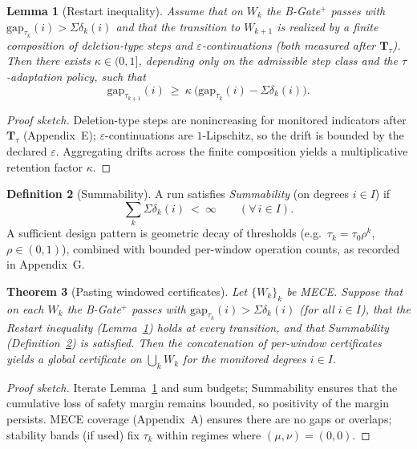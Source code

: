\documentclass[11pt]{article}
\numberwithin{equation}{section}
\newtheorem{theorem}{Theorem}[section]
\newtheorem{lemma}[theorem]{Lemma}
\theoremstyle{definition}
\newtheorem{definition}[theorem]{Definition}
\begin{document}
\begin{lemma}[Restart inequality]\label{J:lem:restart}
Assume that on \(W_k\) the B-Gate\(^{+}\) passes with \(\mathrm{gap}_{\tau_k}(i)>\Sigma\delta_k(i)\) and that the transition to \(W_{k+1}\) is realized by a finite composition of \emph{deletion-type} steps and \(\varepsilon\)-continuations (both measured after \(\mathbf{T}_\tau\)). Then there exists \(\kappa\in(0,1]\), depending only on the admissible step class and the \(\tau\)-adaptation policy, such that
\[
\mathrm{gap}_{\tau_{k+1}}(i)\ \ge\ \kappa\ \bigl(\mathrm{gap}_{\tau_k}(i)-\Sigma\delta_k(i)\bigr).
\]
\end{lemma}

\begin{proof}[Proof sketch]
Deletion-type steps are nonincreasing for monitored indicators after \(\mathbf{T}_\tau\) (Appendix~E); \(\varepsilon\)-continuations are \(1\)-Lipschitz, so the drift is bounded by the declared \(\varepsilon\). Aggregating drifts across the finite composition yields a multiplicative retention factor \(\kappa\).
\end{proof}

\begin{definition}[Summability]\label{J:def:summability}
A run satisfies \emph{Summability} (on degrees \(i\in I\)) if
\[
\sum_{k}\Sigma\delta_k(i)\ <\ \infty\qquad(\forall\,i\in I).
\]
A sufficient design pattern is geometric decay of thresholds (e.g.\ \(\tau_k=\tau_0\rho^k\), \(\rho\in(0,1)\)), combined with bounded per-window operation counts, as recorded in Appendix~G.
\end{definition}

\begin{theorem}[Pasting windowed certificates]\label{J:thm:pasting}
Let \(\{W_k\}_k\) be MECE. Suppose that on each \(W_k\) the B-Gate\(^{+}\) passes with \(\mathrm{gap}_{\tau_k}(i)>\Sigma\delta_k(i)\) (for all \(i\in I\)), that the Restart inequality (Lemma~\ref{J:lem:restart}) holds at every transition, and that Summability (Definition~\ref{J:def:summability}) is satisfied. Then the concatenation of per-window certificates yields a global certificate on \(\bigcup_k W_k\) for the monitored degrees \(i\in I\).
\end{theorem}

\begin{proof}[Proof sketch]
Iterate Lemma~\ref{J:lem:restart} and sum budgets; Summability ensures that the cumulative loss of safety margin remains bounded, so positivity of the margin persists. MECE coverage (Appendix~A) ensures there are no gaps or overlaps; stability bands (if used) fix \(\tau_k\) within regimes where \((\mu,\nu)=(0,0)\).
\end{proof}
\end{document}
